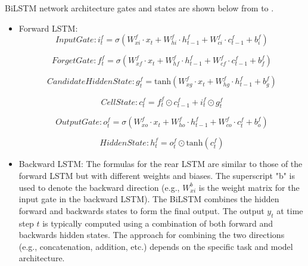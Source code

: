 \documentclass[a4paper, fleqn]{cas-sc}
\theoremstyle{definition}
\theoremstyle{remark}
\begin{document}
BiLSTM network architecture gates and states are shown below from  to .
\begin{itemize}
  \item  Forward LSTM: \\

    \begin{equation} \label{bi i}
      Input Gate :  i_t^f = \sigma(W_{xi}^f \cdot x_t + W_{hi}^f \cdot h_{t-1}^f + W_{ci}^f \cdot c_{t-1}^f + b_i^f)
    \end{equation}

    \begin{equation}
      Forget Gate :  f_t^f = \sigma(W_{xf}^f \cdot x_t + W_{hf}^f \cdot h_{t-1}^f + W_{cf}^f \cdot c_{t-1}^f + b_f^f) 
    \end{equation}

    \begin{equation}
      Candidate Hidden State :   g_t^f = \text{tanh}(W_{xg}^f \cdot x_t + W_{hg}^f \cdot h_{t-1}^f + b_g^f)
    \end{equation}

    \begin{equation}
      Cell State :  c_t^f = f_t^f \odot c_{t-1}^f + i_t^f \odot g_t^f
    \end{equation}

    \begin{equation}
      Output Gate :  o_t^f = \sigma(W_{xo}^f \cdot x_t + W_{ho}^f \cdot h_{t-1}^f + W_{co}^f \cdot c_t^f + b_o^f)
    \end{equation}

    \begin{equation} \label{bi h}
      Hidden State :   h_t^f = o_t^f \odot \text{tanh}(c_t^f) 
    \end{equation}

  \item Backward LSTM: 
  The formulas for the rear LSTM are similar to those of the forward LSTM but with different weights and biases. The superscript "b" is used to denote the backward direction (e.g.,  \(W_{xi}^b\) is the weight matrix for the input gate in the backward LSTM). The BiLSTM combines the hidden forward and backwards states to form the final output. The output \(y_t\) at time step \(t\) is typically computed using a combination of both forward and backwards hidden states. The approach for combining the two directions (e.g.,  concatenation,  addition,  etc.) depends on the specific task and model architecture.
\end{itemize}
\end{document}
